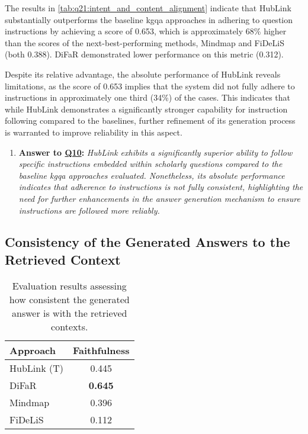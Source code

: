 The results in \autoref{tab:q21:intent_and_content_alignment} indicate that HubLink substantially outperforms the baseline \gls{kgqa} approaches in adhering to question instructions by achieving a score of 0.653, which is approximately 68\% higher than the scores of the next-best-performing methods, Mindmap and FiDeLiS (both 0.388). DiFaR demonstrated lower performance on this metric (0.312).

Despite its relative advantage, the absolute performance of HubLink reveals limitations, as the score of 0.653 implies that the system did not fully adhere to instructions in approximately one third (34\%) of the cases. This indicates that while HubLink demonstrates a significantly stronger capability for instruction following compared to the baselines, further refinement of its generation process is warranted to improve reliability in this aspect.

\begin{enumerate}[label={}] 
 \item \textbf{Answer to \hyperref[sec:evaluation_gqm_plan]{Q10}:} \textit{HubLink exhibits a significantly superior ability to follow specific instructions embedded within scholarly questions compared to the baseline \gls{kgqa} approaches evaluated. Nonetheless, its absolute performance indicates that adherence to instructions is not fully consistent, highlighting the need for further enhancements in the answer generation mechanism to ensure instructions are followed more reliably.} 
\end{enumerate}

\subsection{Consistency of the Generated Answers to the Retrieved Context}

\begin{table}[t]
\centering
\begin{tabular}{@{}lc}
\toprule
Approach & Faithfulness  \\ 
\midrule
HubLink (T) & 0.445 \\
DiFaR & \textbf{0.645} \\
Mindmap & 0.396 \\
FiDeLiS & 0.112 \\

\bottomrule
\end{tabular}%
\caption[Results on Answer to Context Consistency]{Evaluation results assessing how consistent the generated answer is with the retrieved contexts.}
\label{tab:evaluation_of_faithfulness}
\end{table}

